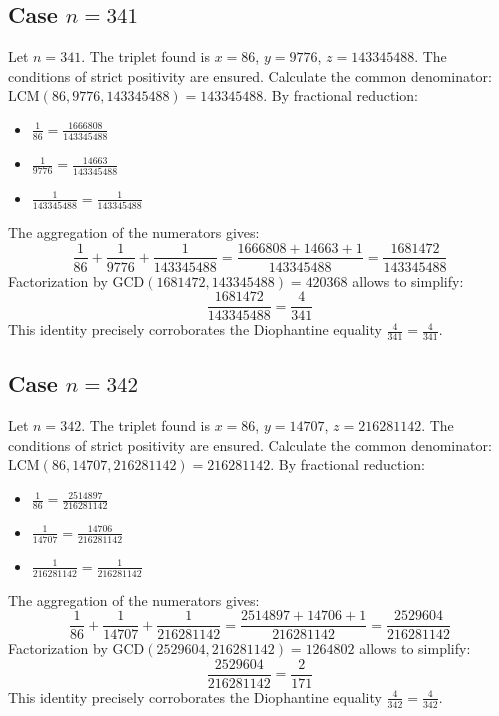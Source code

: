 \documentclass[11pt,a4paper]{article}
\begin{document}
\subsection{Case $n = 341$}
Let $n = 341$. The triplet found is $x = 86$, $y = 9776$, $z = 143345488$.
The conditions of strict positivity are ensured.
Calculate the common denominator: $\text{LCM}(86, 9776, 143345488) = 143345488$.
By fractional reduction:
\begin{itemize}
    \item $\frac{1}{86} = \frac{1666808}{143345488}$
    \item $\frac{1}{9776} = \frac{14663}{143345488}$
    \item $\frac{1}{143345488} = \frac{1}{143345488}$
\end{itemize}
The aggregation of the numerators gives:
$$ \frac{1}{86} + \frac{1}{9776} + \frac{1}{143345488} = \frac{1666808 + 14663 + 1}{143345488} = \frac{1681472}{143345488} $$
Factorization by $\text{GCD}(1681472, 143345488) = 420368$ allows to simplify:
$$ \frac{1681472}{143345488} = \frac{4}{341} $$
This identity precisely corroborates the Diophantine equality $\frac{4}{341} = \frac{4}{341}$.

\subsection{Case $n = 342$}
Let $n = 342$. The triplet found is $x = 86$, $y = 14707$, $z = 216281142$.
The conditions of strict positivity are ensured.
Calculate the common denominator: $\text{LCM}(86, 14707, 216281142) = 216281142$.
By fractional reduction:
\begin{itemize}
    \item $\frac{1}{86} = \frac{2514897}{216281142}$
    \item $\frac{1}{14707} = \frac{14706}{216281142}$
    \item $\frac{1}{216281142} = \frac{1}{216281142}$
\end{itemize}
The aggregation of the numerators gives:
$$ \frac{1}{86} + \frac{1}{14707} + \frac{1}{216281142} = \frac{2514897 + 14706 + 1}{216281142} = \frac{2529604}{216281142} $$
Factorization by $\text{GCD}(2529604, 216281142) = 1264802$ allows to simplify:
$$ \frac{2529604}{216281142} = \frac{2}{171} $$
This identity precisely corroborates the Diophantine equality $\frac{4}{342} = \frac{4}{342}$.
\end{document}
